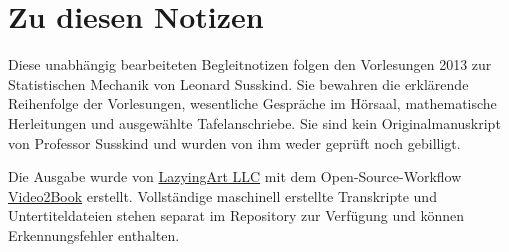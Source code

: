 \documentclass[11pt,oneside]{book}
\begin{document}
\frontmatter
\hypersetup{pageanchor=false}

\hypersetup{pageanchor=true}

\chapter{Zu diesen Notizen}
Diese unabhängig bearbeiteten Begleitnotizen folgen den Vorlesungen 2013 zur Statistischen Mechanik von Leonard Susskind. Sie bewahren die erklärende Reihenfolge der Vorlesungen, wesentliche Gespräche im Hörsaal, mathematische Herleitungen und ausgewählte Tafelanschriebe. Sie sind kein Originalmanuskript von Professor Susskind und wurden von ihm weder geprüft noch gebilligt.

Die Ausgabe wurde von \href{https://lazying.art}{LazyingArt LLC} mit dem Open-Source-Workflow \href{https://github.com/lachlanchen/Video2Book}{Video2Book} erstellt. Vollständige maschinell erstellte Transkripte und Untertiteldateien stehen separat im Repository zur Verfügung und können Erkennungsfehler enthalten.
\clearpage
\tableofcontents
\mainmatter










\end{document}
